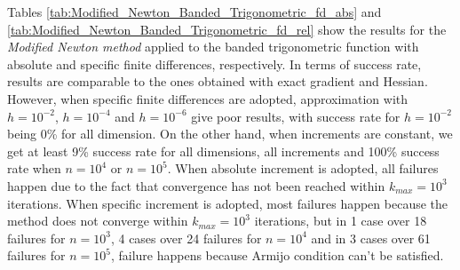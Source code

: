 Tables \ref{tab:Modified_Newton_Banded_Trigonometric_fd_abs} and \ref{tab:Modified_Newton_Banded_Trigonometric_fd_rel} show the results for the \textit{Modified Newton method} applied to the banded trigonometric function with absolute and specific finite differences, respectively.
In terms of success rate, results are comparable to the ones obtained with exact gradient and Hessian.
However, when specific finite differences are adopted, approximation with $h=10^{-2}$, $h=10^{-4}$ and $h=10^{-6}$ give poor results, with success rate for $h=10^{-2}$ being 0\% for all dimension.
On the other hand, when increments are constant, we get at least 9\% success rate for all dimensions, all increments and 100\% success rate when $n=10^{4}$ or $n=10^{5}$.
When absolute increment is adopted, all failures happen due to the fact that convergence has not been reached within $k_{\textit{max}} = 10^3$ iterations.
When specific increment is adopted, most failures happen because the method does not converge within $k_{\textit{max}} = 10^3$ iterations, but in 1 case over 18 failures for $n=10^{3}$, 4 cases over 24 failures for $n=10^4$ and in 3 cases over 61 failures for $n=10^5$, failure happens because Armijo condition can't be satisfied.

